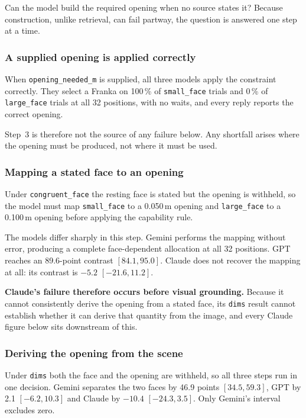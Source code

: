 Can the model build the required opening when no source states it? Because
construction, unlike retrieval, can fail partway, the question is answered one
step at a time.

\subsubsection{A supplied opening is applied correctly}

When \texttt{opening\_needed\_m} is supplied, all three models apply the
constraint correctly. They select a Franka on 100\,\% of \texttt{small\_face}
trials and 0\,\% of \texttt{large\_face} trials at all 32 positions, with no
waits, and every reply reports the correct opening.

Step~3 is therefore not the source of any failure below. Any shortfall arises
where the opening must be produced, not where it must be used.

\subsubsection{Mapping a stated face to an opening}

Under \texttt{congruent\_face} the resting face is stated but the opening is
withheld, so the model must map \texttt{small\_face} to a 0.050\,m opening and
\texttt{large\_face} to a 0.100\,m opening before applying the capability rule.

The models differ sharply in this step. Gemini performs the mapping without
error, producing a complete face-dependent allocation at all 32 positions. GPT
reaches an 89.6-point contrast $[84.1, 95.0]$. Claude does not recover the
mapping at all: its contrast is $-5.2$ $[-21.6, 11.2]$.

\textbf{Claude's failure therefore occurs before visual grounding.} Because it
cannot consistently derive the opening from a stated face, its \texttt{dims}
result cannot establish whether it can derive that quantity from the image, and
every Claude figure below sits downstream of this.

\subsubsection{Deriving the opening from the scene}

Under \texttt{dims} both the face and the opening are withheld, so all three
steps run in one decision. Gemini separates the two faces by 46.9 points
$[34.5, 59.3]$, GPT by 2.1 $[-6.2, 10.3]$ and Claude by $-10.4$ $[-24.3, 3.5]$.
Only Gemini's interval excludes zero.

